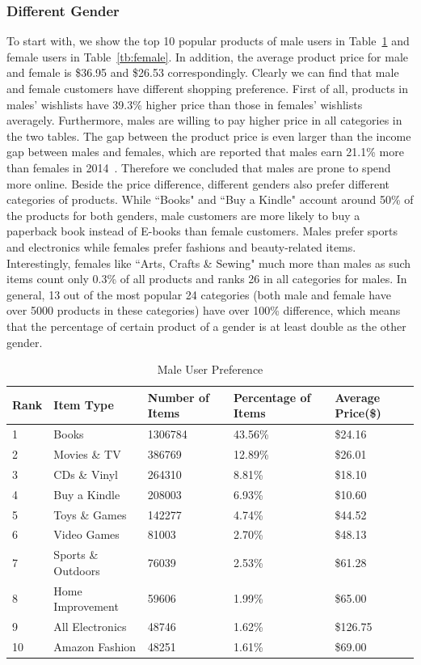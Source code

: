 \subsubsection{Different Gender}
To start with, we show the top 10 popular products of male users in Table~\ref{tb:male} and female users in Table~\ref{tb:female}. In addition, the average product price for male and female is \$36.95 and \$26.53 correspondingly. Clearly we can find that male and female customers have different shopping preference. First of all, products in males' wishlists have 39.3\% higher price than those in females' wishlists averagely. Furthermore, males are willing to pay higher price in all categories in the two tables. The gap between the product price is even larger than the income gap between males and females, which are reported that males earn 21.1\% more than females in 2014~\cite{menvswomen}. Therefore we concluded that males are prone to spend more online. Beside the price difference, different genders also prefer different categories of products. While ``Books" and ``Buy a Kindle" account around 50\% of the products for both genders, male customers are more likely to buy a paperback book instead of E-books than female customers. Males prefer sports and electronics while females prefer fashions and beauty-related items. Interestingly, females like ``Arts, Crafts \& Sewing" much more than males as such items count only 0.3\% of all products and ranks 26 in all categories for males. In general, 13 out of the most popular 24 categories (both male and female have over 5000 products in these categories) have over 100\% difference, which means that the percentage of certain product of a gender is at least double as the other gender. 

\begin{table}[!ht]
\centering
\caption{Male User Preference}
\label{tb:male}
\begin{adjustbox}{max width=.5\textwidth}
\begin{tabular}{lllll}
Rank & Item Type          & Number of Items & Percentage of Items & Average Price(\$) \\ \hline
1 & Books & 1306784 & 43.56\% & \$24.16 \\
2 & Movies \& TV & 386769 & 12.89\% & \$26.01 \\
3 & CDs \& Vinyl & 264310 & 8.81\% & \$18.10 \\
4 & Buy a Kindle & 208003 & 6.93\% & \$10.60 \\
5 & Toys \& Games & 142277 & 4.74\% & \$44.52 \\
6 & Video Games & 81003 & 2.70\% & \$48.13 \\
7 & Sports \& Outdoors & 76039 & 2.53\% & \$61.28 \\
8 & Home Improvement & 59606 & 1.99\% & \$65.00 \\
9 & All Electronics & 48746 & 1.62\% & \$126.75 \\
10 & Amazon Fashion & 48251 & 1.61\% & \$69.00 \\
\end{tabular}
\end{adjustbox}
\end{table}


